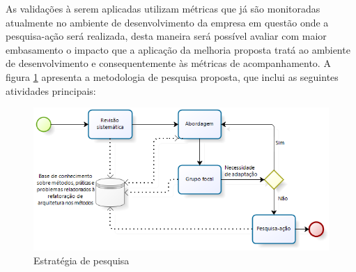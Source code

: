 As validações à serem aplicadas utilizam métricas que já são monitoradas atualmente no ambiente de desenvolvimento da empresa em questão onde a pesquisa-ação será realizada, desta maneira será possível avaliar com maior embasamento o impacto que a aplicação da melhoria proposta tratá ao ambiente de desenvolvimento e consequentemente às métricas de acompanhamento. A figura \ref{fig:estrategia_pesquisa} apresenta a metodologia de pesquisa proposta, que inclui as seguintes atividades principais:
\begin{figure}[ht]
\centering
\includegraphics[scale=0.90]{figuras/estrategia_pesquisa}
\caption{ Estratégia de pesquisa}
\label{fig:estrategia_pesquisa}
\end{figure}





